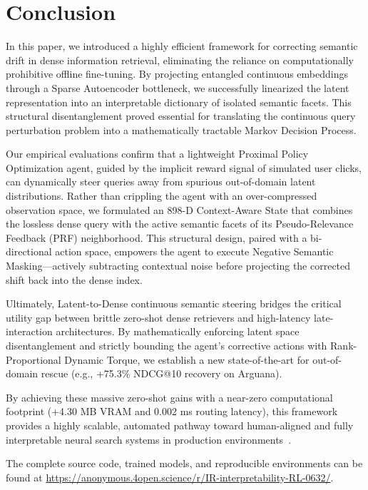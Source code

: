 \section{Conclusion}

In this paper, we introduced a highly efficient framework for correcting semantic drift in dense information retrieval, eliminating the reliance on computationally prohibitive offline fine-tuning. By projecting entangled continuous embeddings through a Sparse Autoencoder bottleneck, we successfully linearized the latent representation into an interpretable dictionary of isolated semantic facets. This structural disentanglement proved essential for translating the continuous query perturbation problem into a mathematically tractable Markov Decision Process.

Our empirical evaluations confirm that a lightweight Proximal Policy Optimization agent, guided by the implicit reward signal of simulated user clicks, can dynamically steer queries away from spurious out-of-domain latent distributions. Rather than crippling the agent with an over-compressed observation space, we formulated an 898-D Context-Aware State that combines the lossless dense query with the active semantic facets of its Pseudo-Relevance Feedback (PRF) neighborhood. This structural design, paired with a bi-directional action space, empowers the agent to execute Negative Semantic Masking—actively subtracting contextual noise before projecting the corrected shift back into the dense index.

Ultimately, Latent-to-Dense continuous semantic steering bridges the critical utility gap between brittle zero-shot dense retrievers and high-latency late-interaction architectures. By mathematically enforcing latent space disentanglement and strictly bounding the agent's corrective actions with Rank-Proportional Dynamic Torque, we establish a new state-of-the-art for out-of-domain rescue (e.g., +75.3\% NDCG@10 recovery on Arguana).

By achieving these massive zero-shot gains with a near-zero computational footprint (+4.30 MB VRAM and 0.002 ms routing latency), this framework provides a highly scalable, automated pathway toward human-aligned and fully interpretable neural search systems in production environments~\citep{ouyang2022}.

\clearpage




\beginSupplementaryMaterials
The complete source code, trained models, and reproducible environments can be found at \url{https://anonymous.4open.science/r/IR-interpretability-RL-0632/}.




